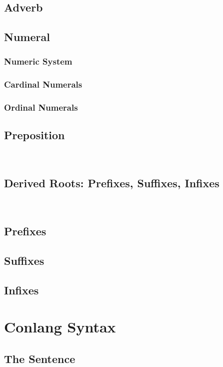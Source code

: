 \documentclass[12pt,a4paper]{article}
\begin{document}
	\subsection{Adverb}
	
	\subsection{Numeral}
		\subsubsection{Numeric System}
		\subsubsection{Cardinal Numerals}
		\subsubsection{Ordinal Numerals}
		
	\subsection{Preposition} ~
	
	\subsection{Derived Roots: Prefixes, Suffixes, Infixes} ~
		\subsection{Prefixes}
		\subsection{Suffixes}
		\subsection{Infixes}
	
\section{Conlang Syntax}	
	\subsection{The Sentence}
	
\end{document}
